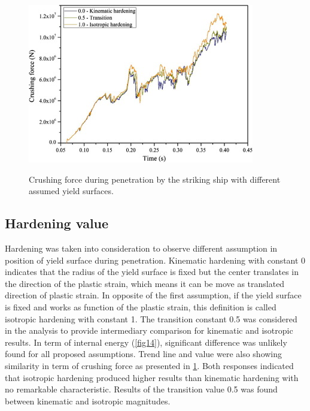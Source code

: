 \documentclass[../Final.tex]{subfiles}
\begin{document}
\begin{figure}[ht]
    \centering
    \includegraphics[width=\columnwidth]{fig15.jpg}
    \label{fig15}
    \caption{Crushing force during penetration by the striking ship with different assumed yield surfaces.}
\end{figure}

\subsection{Hardening value}

Hardening was taken into consideration to observe different assumption in position of yield surface during penetration. 
Kinematic hardening with constant 0 indicates that the radius of the yield surface is fixed but the center translates in the direction of the plastic strain, which means it can be move as translated direction of plastic strain. 
In opposite of the first assumption, if the yield surface is fixed and works as function of the plastic strain, this definition is called isotropic hardening with constant 1. 
The transition constant 0.5 was considered in the analysis to provide intermediary comparison for kinematic and isotropic results. 
In term of internal energy (\ref{fig14}), significant difference was unlikely found for all proposed assumptions. Trend line and value were also showing similarity in term of crushing force as presented in \ref{fig15}. 
Both responses indicated that isotropic hardening produced higher results than kinematic hardening with no remarkable characteristic. Results of the transition value 0.5 was found between kinematic and isotropic magnitudes. 
\end{document}
